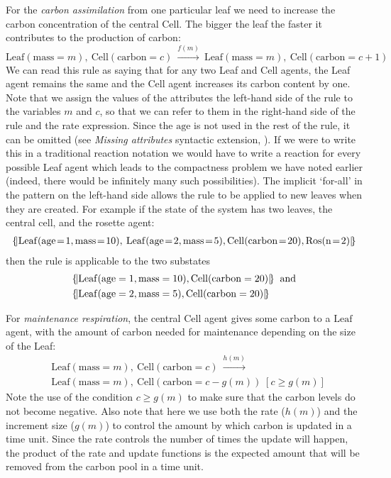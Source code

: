 For the \textit{carbon assimilation} from one particular leaf we need to
increase the carbon concentration of the central Cell. The bigger the leaf the
faster it contributes to the production of carbon:
\[\mathrm{Leaf}(\mathrm{mass}=m), \: \mathrm{Cell}(\mathrm{carbon}=c) \:
  \xrightarrow{f(m)} \: \mathrm{Leaf}(\mathrm{mass}=m), \:
  \mathrm{Cell}(\mathrm{carbon}=c+1)\] We can read this rule as saying that for
any two Leaf and Cell agents, the Leaf agent remains the same and the Cell agent
increases its carbon content by one. Note that we assign the values of the
attributes the left-hand side of the rule to the variables $m$ and $c$, so that
we can refer to them in the right-hand side of the rule and the rate
expression. Since the $\mathrm{age}$ is not used in the rest of the rule, it can
be omitted (see \textit{Missing attributes} syntactic extension,
). If we were to write this in a traditional reaction notation we
would have to write a reaction for every possible Leaf agent which leads to the
compactness problem we have noted earlier (indeed, there would be infinitely
many such possibilities). The implicit `for-all' in the pattern on the left-hand
side allows the rule to be applied to new leaves when they are created. For
example if the state of the system has two leaves, the central cell, and the
rosette agent:
\begin{align*}
\m{ \mathrm{Leaf}(\ar{age}{1}, \ar{mass}{10}), \:
\mathrm{Leaf}(\ar{age}{2}, \ar{mass}{5}),
\mathrm{Cell}(\ar{carbon}{20}), \mr{Ros}(\ar{n}{2})}
\end{align*}
then the rule is applicable to the two substates
\begin{align*}
& \{\!| \mathrm{Leaf}(\mathrm{age}=1, \mathrm{mass}=10),
                 \mathrm{Cell}(\mathrm{carbon}=20) |\!\} \: \text{ and} \\
&\{\!| \mathrm{Leaf}(\mathrm{age}=2,
  \mathrm{mass}=5), \mathrm{Cell}(\mathrm{carbon}=20) |\!\}
\end{align*}

For \textit{maintenance respiration}, the central $\mathrm{Cell}$ agent gives
some carbon to a $\mathrm{Leaf}$ agent, with the amount of carbon needed for
maintenance depending on the size of the Leaf:
%
\begin{align*}
&\mathrm{Leaf}(\mathrm{mass}=m),\: \mathrm{Cell}(\mathrm{carbon}=c) \:
\xrightarrow{h(m)} \\ &\mathrm{Leaf}(\mathrm{mass}=m),\:
\mathrm{Cell}(\mathrm{carbon}=c-g(m)) \; [c \geq g(m)]
\end{align*}
Note the use of the condition $c \geq g(m)$ to make sure that the
carbon levels do not become negative. Also note that here we use both the rate
($h(m)$) and the increment size ($g(m)$) to control the amount by which carbon
is updated in a time unit. Since the rate controls the number of times the
update will happen, the product of the rate and update functions is the expected
amount that will be removed from the carbon pool in a time unit.

